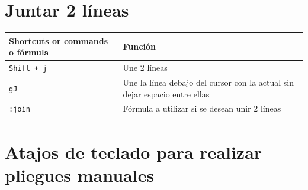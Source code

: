 \documentclass[
  doc,
  floatsintext,
  longtable,
  a4paper,
  nolmodern,
  notxfonts,
  notimes,
  12pt,
  colorlinks=true,linkcolor=blue,citecolor=blue,urlcolor=blue]{apa7}
\newcounter{none} %
\begin{document}
\section{Juntar 2 líneas}\label{juntar-2-luxedneas}

{\def\LTcaptype{none} %
\begin{longtable}[]{@{}
  >{\raggedright\arraybackslash}p{}
  >{\raggedright\arraybackslash}p{}@{}}
\toprule\noalign{}
\begin{minipage}[b]{\linewidth}\raggedright
Shortcuts or commands o fórmula
\end{minipage} & \begin{minipage}[b]{\linewidth}\raggedright
Función
\end{minipage} \\
\midrule\noalign{}
\endhead
\bottomrule\noalign{}
\endlastfoot
\texttt{Shift\ +\ j} & Une 2 líneas \\
\texttt{gJ} & Une la línea debajo del cursor con la actual sin dejar
espacio entre ellas \\
\texttt{:join} & Fórmula a utilizar si se desean unir 2 líneas \\
\end{longtable}
}

\section{Atajos de teclado para realizar pliegues
manuales}\label{atajos-de-teclado-para-realizar-pliegues-manuales}
\end{document}
